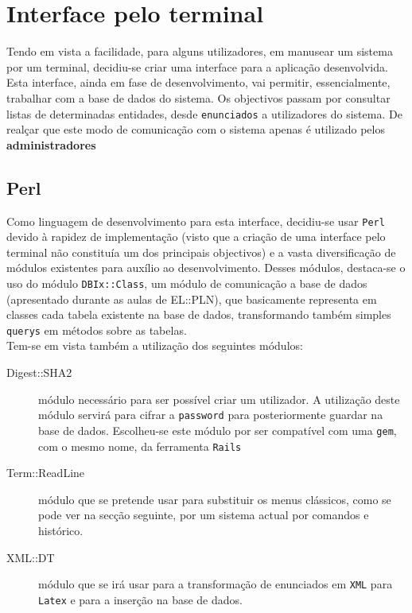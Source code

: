 \chapter{Interface pelo terminal}
\minitoc

Tendo em vista a facilidade, para alguns utilizadores, em manusear um sistema por um terminal, decidiu-se criar uma interface para a aplicação desenvolvida. Esta interface, 
ainda em fase de desenvolvimento, vai permitir, essencialmente, trabalhar com a base de dados do sistema. Os objectivos passam por consultar listas de determinadas entidades, 
desde \texttt{enunciados} a utilizadores do sistema. De realçar que este modo de comunicação com o sistema apenas é utilizado pelos \textbf{administradores}\\

\section{Perl}

Como linguagem de desenvolvimento para esta interface, decidiu-se usar \texttt{Perl} devido à rapidez de implementação (visto que a criação de uma interface pelo terminal não 
constituía um dos principais objectivos) e a vasta diversificação de módulos existentes para auxílio ao desenvolvimento. Desses módulos, destaca-se o uso do módulo 
\texttt{DBIx::Class}, um módulo de comunicação a base de dados (apresentado durante as aulas de EL::PLN), 
que basicamente representa em classes cada tabela existente na base de dados, transformando também simples \texttt{querys} em métodos sobre as tabelas.\\

Tem-se em vista também a utilização dos seguintes módulos:

\begin{description}
 \item[Digest::SHA2] módulo necessário para ser possível criar um utilizador. A utilização deste módulo servirá para cifrar a \texttt{password} para posteriormente guardar na base de dados.
Escolheu-se este módulo por ser compatível com uma \texttt{gem}, com o mesmo nome, da ferramenta \texttt{Rails}
 \item[Term::ReadLine] módulo que se pretende usar para substituir os menus clássicos, como se pode ver na secção seguinte, por um sistema actual por comandos e histórico.
 \item[XML::DT] módulo que se irá usar para a transformação de enunciados em \texttt{XML} para \texttt{Latex} e para a inserção na base de dados. 
\end{description}

